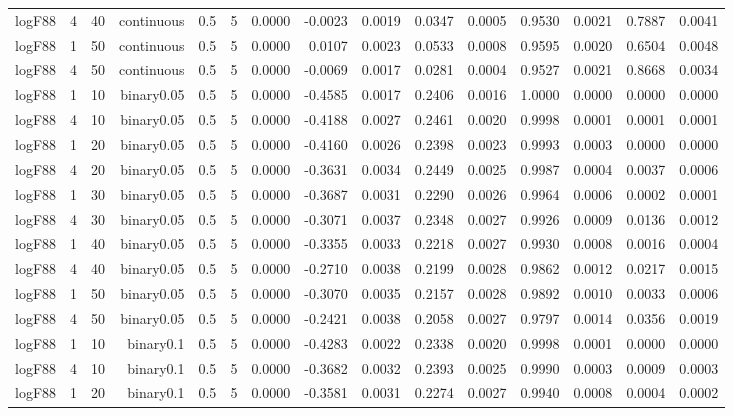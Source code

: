 \begin{longtable}{rrrrrrrrrrrrrrr}
  logF88 & 4 & 40 & continuous & 0.5 & 5 & 0.0000 & -0.0023 & 0.0019 & 0.0347 & 0.0005 & 0.9530 & 0.0021 & 0.7887 & 0.0041 \\ 
  logF88 & 1 & 50 & continuous & 0.5 & 5 & 0.0000 & 0.0107 & 0.0023 & 0.0533 & 0.0008 & 0.9595 & 0.0020 & 0.6504 & 0.0048 \\ 
  logF88 & 4 & 50 & continuous & 0.5 & 5 & 0.0000 & -0.0069 & 0.0017 & 0.0281 & 0.0004 & 0.9527 & 0.0021 & 0.8668 & 0.0034 \\ 
  logF88 & 1 & 10 & binary0.05 & 0.5 & 5 & 0.0000 & -0.4585 & 0.0017 & 0.2406 & 0.0016 & 1.0000 & 0.0000 & 0.0000 & 0.0000 \\ 
  logF88 & 4 & 10 & binary0.05 & 0.5 & 5 & 0.0000 & -0.4188 & 0.0027 & 0.2461 & 0.0020 & 0.9998 & 0.0001 & 0.0001 & 0.0001 \\ 
  logF88 & 1 & 20 & binary0.05 & 0.5 & 5 & 0.0000 & -0.4160 & 0.0026 & 0.2398 & 0.0023 & 0.9993 & 0.0003 & 0.0000 & 0.0000 \\ 
  logF88 & 4 & 20 & binary0.05 & 0.5 & 5 & 0.0000 & -0.3631 & 0.0034 & 0.2449 & 0.0025 & 0.9987 & 0.0004 & 0.0037 & 0.0006 \\ 
  logF88 & 1 & 30 & binary0.05 & 0.5 & 5 & 0.0000 & -0.3687 & 0.0031 & 0.2290 & 0.0026 & 0.9964 & 0.0006 & 0.0002 & 0.0001 \\ 
  logF88 & 4 & 30 & binary0.05 & 0.5 & 5 & 0.0000 & -0.3071 & 0.0037 & 0.2348 & 0.0027 & 0.9926 & 0.0009 & 0.0136 & 0.0012 \\ 
  logF88 & 1 & 40 & binary0.05 & 0.5 & 5 & 0.0000 & -0.3355 & 0.0033 & 0.2218 & 0.0027 & 0.9930 & 0.0008 & 0.0016 & 0.0004 \\ 
  logF88 & 4 & 40 & binary0.05 & 0.5 & 5 & 0.0000 & -0.2710 & 0.0038 & 0.2199 & 0.0028 & 0.9862 & 0.0012 & 0.0217 & 0.0015 \\ 
  logF88 & 1 & 50 & binary0.05 & 0.5 & 5 & 0.0000 & -0.3070 & 0.0035 & 0.2157 & 0.0028 & 0.9892 & 0.0010 & 0.0033 & 0.0006 \\ 
  logF88 & 4 & 50 & binary0.05 & 0.5 & 5 & 0.0000 & -0.2421 & 0.0038 & 0.2058 & 0.0027 & 0.9797 & 0.0014 & 0.0356 & 0.0019 \\ 
  logF88 & 1 & 10 & binary0.1 & 0.5 & 5 & 0.0000 & -0.4283 & 0.0022 & 0.2338 & 0.0020 & 0.9998 & 0.0001 & 0.0000 & 0.0000 \\ 
  logF88 & 4 & 10 & binary0.1 & 0.5 & 5 & 0.0000 & -0.3682 & 0.0032 & 0.2393 & 0.0025 & 0.9990 & 0.0003 & 0.0009 & 0.0003 \\ 
  logF88 & 1 & 20 & binary0.1 & 0.5 & 5 & 0.0000 & -0.3581 & 0.0031 & 0.2274 & 0.0027 & 0.9940 & 0.0008 & 0.0004 & 0.0002 \\ 

\end{longtable}
